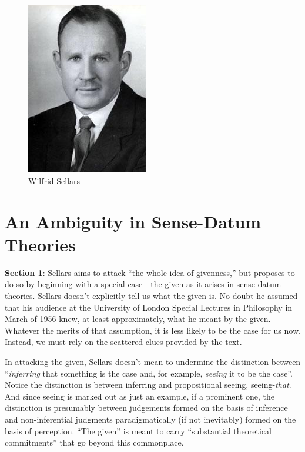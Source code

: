 \documentclass[11pt]{article}
\title{\mytitle\\
\mysubtitle}
\author{\myauthor}
\date{} %
\begin{document}
\maketitle

\setlength{\parindent}{1em}


\begin{figure}[htbp]
	\centering
		\includegraphics[scale=0.5]{../graphics/sellars.jpeg}
	\caption{Wilfrid Sellars}
	\label{fig:sellars}
\end{figure}

\section{An Ambiguity in Sense-Datum Theories} %
\label{sec:an_ambiguity_in_sense_datum_theories}

\textbf{Section 1}: Sellars aims to attack ``the whole idea of givenness,'' but proposes to do so by beginning with a special case---the given as it arises in sense-datum theories. Sellars doesn't explicitly tell us what the given is. No doubt he assumed that his audience at the University of London Special Lectures in Philosophy in March of 1956 knew, at least approximately, what he meant by the given. Whatever the merits of that assumption, it is less likely to be the case for us now. Instead, we must rely on the scattered clues provided by the text.

In attacking the given, Sellars doesn't mean to undermine the distinction between ``\emph{inferring} that something is the case and, for example, \emph{seeing} it to be the case''. Notice the distinction is between inferring and propositional seeing, seeing-\emph{that}. And since seeing is marked out as just an example, if a prominent one, the distinction is presumably between judgements formed on the basis of inference and non-inferential judgments paradigmatically (if not inevitably) formed on the basis of perception. ``The given'' is meant to carry ``substantial theoretical commitments'' that go beyond this commonplace.
\end{document}

